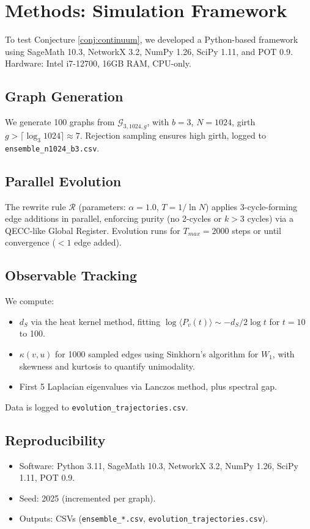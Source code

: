 \documentclass[11pt, a4paper]{article}
\begin{document}
\section{Methods: Simulation Framework}

To test Conjecture \ref{conj:continuum}, we developed a Python-based framework using SageMath 10.3, NetworkX 3.2, NumPy 1.26, SciPy 1.11, and POT 0.9. Hardware: Intel i7-12700, 16GB RAM, CPU-only.

\subsection{Graph Generation}
We generate 100 graphs from $\mathcal{G}_{3,1024,g}$, with $b=3$, $N=1024$, girth $g > \lceil \log_3 1024 \rceil \approx 7$. Rejection sampling ensures high girth, logged to \texttt{ensemble_n1024_b3.csv}.

\subsection{Parallel Evolution}
The rewrite rule $\mathcal{R}$ (parameters: $\alpha=1.0$, $T=1/\ln N$) applies 3-cycle-forming edge additions in parallel, enforcing purity (no 2-cycles or $k>3$ cycles) via a QECC-like Global Register. Evolution runs for $T_{max}=2000$ steps or until convergence ($<1$ edge added).

\subsection{Observable Tracking}
We compute:
\begin{itemize}
  \item $d_S$ via the heat kernel method, fitting $\log \langle P_v(t) \rangle \sim -d_S/2 \log t$ for $t=10$ to 100.
  \item $\kappa(v, u)$ for 1000 sampled edges using Sinkhorn’s algorithm for $W_1$, with skewness and kurtosis to quantify unimodality.
  \item First 5 Laplacian eigenvalues via Lanczos method, plus spectral gap.
\end{itemize}
Data is logged to \texttt{evolution_trajectories.csv}.

\subsection{Reproducibility}
\begin{itemize}
  \item Software: Python 3.11, SageMath 10.3, NetworkX 3.2, NumPy 1.26, SciPy 1.11, POT 0.9.
  \item Seed: 2025 (incremented per graph).
  \item Outputs: CSVs (\texttt{ensemble_*.csv}, \texttt{evolution_trajectories.csv}).
\end{itemize}
\end{document}
